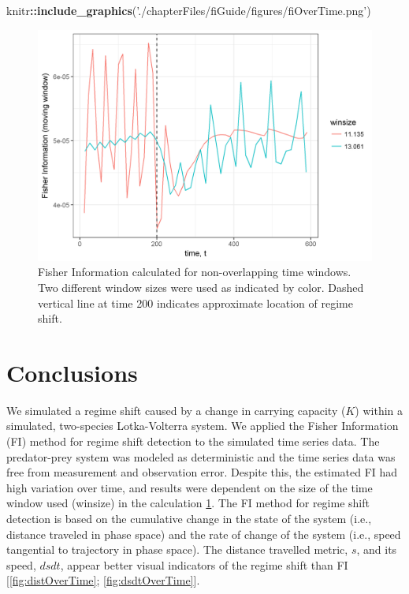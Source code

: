 \documentclass[12pt,twoside,openany]{reedthesis}
\newenvironment{Shaded}{\begin{snugshade}}{\end{snugshade}}
\newcommand{\KeywordTok}[1]{\textcolor[rgb]{0.13,0.29,0.53}{\textbf{#1}}}
\newcommand{\NormalTok}[1]{#1}
\newcommand{\OperatorTok}[1]{\textcolor[rgb]{0.81,0.36,0.00}{\textbf{#1}}}
\newcommand{\StringTok}[1]{\textcolor[rgb]{0.31,0.60,0.02}{#1}}
\begin{document}
\begin{Shaded}
\begin{Highlighting}[]
\NormalTok{knitr}\OperatorTok{::}\KeywordTok{include_graphics}\NormalTok{(}\StringTok{'./chapterFiles/fiGuide/figures/fiOverTime.png'}\NormalTok{)}
\end{Highlighting}
\end{Shaded}
\begin{figure}
\includegraphics[width=27.08in]{./chapterFiles/fiGuide/figures/fiOverTime} \caption{Fisher Information calculated for non-overlapping time windows. Two different window sizes were used as indicated by color. Dashed vertical line at time 200 indicates approximate location of regime shift.}\label{fig:fiOverTime}
\end{figure}
\hypertarget{conclusions-1}{%
\section{Conclusions}\label{conclusions-1}}

We simulated a regime shift caused by a change in carrying capacity (\(K\)) within a simulated, two-species Lotka-Volterra system. We applied the Fisher Information (FI) method for regime shift detection to the simulated time series data. The predator-prey system was modeled as deterministic and the time series data was free from measurement and observation error. Despite this, the estimated FI had high variation over time, and results were dependent on the size of the time window used (winsize) in the calculation \ref{fig:fiOverTime}. The FI method for regime shift detection is based on the cumulative change in the state of the system (i.e., distance traveled in phase space) and the rate of change of the system (i.e., speed tangential to trajectory in phase space). The distance travelled metric, \(s\), and its speed, \(dsdt\), appear better visual indicators of the regime shift than FI {[}\ref{fig:distOverTime}; \ref{fig:dsdtOverTime}{]}.
\end{document}
